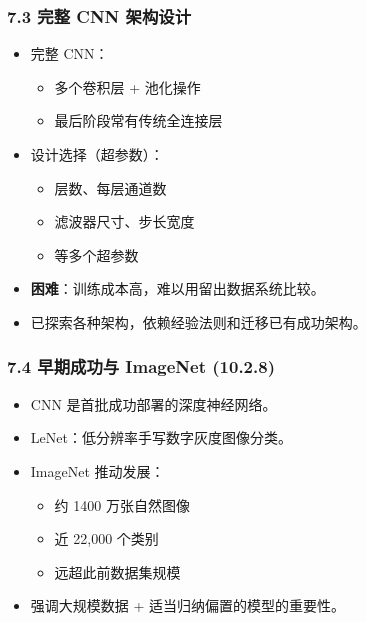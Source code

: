 \documentclass[t,aspectratio=169]{beamer} %
\begin{document}
\begin{frame}
    \frametitle{7.3 完整 CNN 架构设计}
    \begin{itemize}
        \item 完整 CNN：
        \begin{itemize}
            \item 多个卷积层 + 池化操作
            \item 最后阶段常有传统全连接层
        \end{itemize}
        \item 设计选择（超参数）：
        \begin{itemize}
            \item 层数、每层通道数
            \item 滤波器尺寸、步长宽度
            \item 等多个超参数
        \end{itemize}
        \item \textbf{困难}：训练成本高，难以用留出数据系统比较。
        \item 已探索各种架构，依赖经验法则和迁移已有成功架构。
    \end{itemize}
\end{frame}

\begin{frame}
    \frametitle{7.4 早期成功与 ImageNet (10.2.8)}
    \begin{itemize}
        \item CNN 是首批成功部署的\alert{深度神经网络}。
        \item \alert{LeNet}：低分辨率手写数字灰度图像分类。
        \item \alert{ImageNet} 推动发展：
        \begin{itemize}
            \item 约 1400 万张自然图像
            \item 近 22,000 个类别
            \item 远超此前数据集规模
        \end{itemize}
        \item 强调\alert{大规模数据} + \alert{适当归纳偏置}的模型的重要性。
    \end{itemize}
\end{frame}
\end{document}
